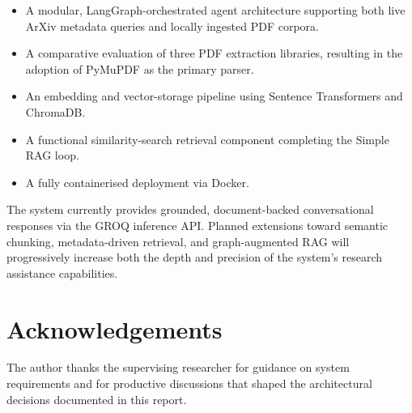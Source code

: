 \documentclass[12pt, a4paper]{article}
\begin{document}
\begin{itemize}[leftmargin=*]
    \item A modular, LangGraph-orchestrated agent architecture supporting
          both live ArXiv metadata queries and locally ingested PDF
          corpora.
    \item A comparative evaluation of three PDF extraction libraries,
          resulting in the adoption of PyMuPDF as the primary parser.
    \item An embedding and vector-storage pipeline using Sentence
          Transformers and ChromaDB.
    \item A functional similarity-search retrieval component completing
          the Simple RAG loop.
    \item A fully containerised deployment via Docker.
\end{itemize}

The system currently provides grounded, document-backed conversational
responses via the GROQ inference API. Planned extensions toward
semantic chunking, metadata-driven retrieval, and graph-augmented RAG
will progressively increase both the depth and precision of the
system's research assistance capabilities.

\section*{Acknowledgements}

The author thanks the supervising researcher for guidance on system
requirements and for productive discussions that shaped the architectural
decisions documented in this report.
\end{document}

